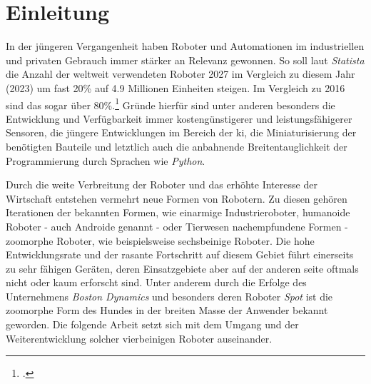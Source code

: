 \section{Einleitung}

In der jüngeren Vergangenheit haben Roboter und Automationen im industriellen und privaten Gebrauch immer stärker an Relevanz gewonnen.
So soll laut \emph{Statista} die Anzahl der weltweit verwendeten Roboter \num{2027} im Vergleich zu diesem Jahr (\num{2023}) um fast \num{20}\% auf \num{4,9} Millionen Einheiten steigen.
Im Vergleich zu \num{2016} sind das sogar über \num{80}\%.\footcite{statista_robotics_market}
Gründe hierfür sind unter anderen besonders die Entwicklung und Verfügbarkeit immer kostengünstigerer und leistungsfähigerer Sensoren,
die jüngere Entwicklungen im Bereich der \gls{ki}, die Miniaturisierung der benötigten Bauteile und letztlich auch
die anbahnende Breitentauglichkeit der Programmierung durch Sprachen wie \emph{Python}.


Durch die weite Verbreitung der Roboter und das erhöhte Interesse der Wirtschaft entstehen vermehrt neue Formen von Robotern.
Zu diesen gehören Iterationen der bekannten Formen, wie einarmige Industrieroboter, humanoide Roboter - auch Androide genannt - oder
Tierwesen nachempfundene Formen - zoomorphe Roboter, wie beispielsweise sechsbeinige Roboter.
Die hohe Entwicklungsrate und der rasante Fortschritt auf diesem Gebiet führt einerseits zu sehr fähigen Geräten,
deren Einsatzgebiete aber auf der anderen seite oftmals nicht oder kaum erforscht sind.
Unter anderem durch die Erfolge des Unternehmens \emph{Boston Dynamics} und besonders deren Roboter \emph{Spot} ist die zoomorphe Form
des Hundes in der breiten Masse der Anwender bekannt geworden.
Die folgende Arbeit setzt sich mit dem Umgang und der Weiterentwicklung solcher vierbeinigen Roboter auseinander.

